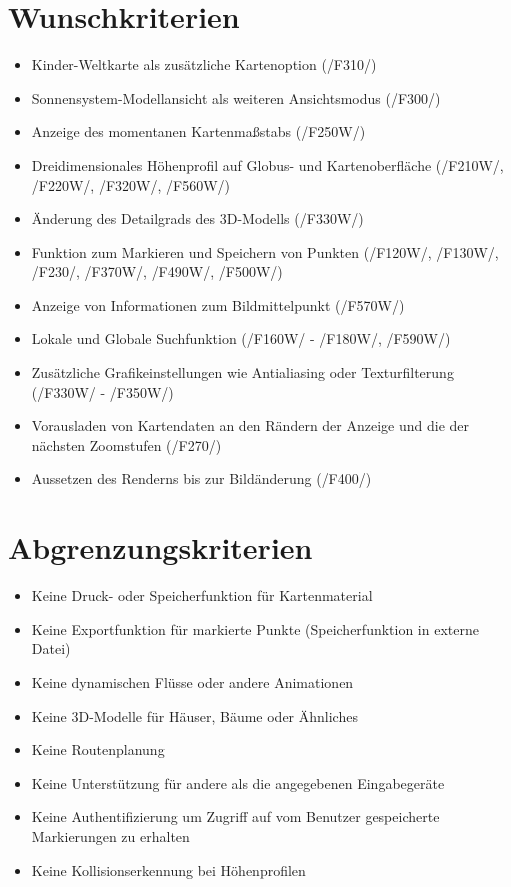 \documentclass[10pt]{scrreprt}
\newcommand{\ziel}[1]{{\fontsize{9.5}{11}\textsf{/#1/}}}
\begin{document}
\section{Wunschkriterien}
\begin{itemize}
\item Kinder-Weltkarte als zusätzliche Kartenoption (\ziel{F310})
\item Sonnensystem-Modellansicht als weiteren Ansichtsmodus (\ziel{F300})
\item Anzeige des momentanen Kartenmaßstabs (\ziel{F250W})
\item Dreidimensionales Höhenprofil auf Globus- und Kartenoberfläche (\ziel{F210W}, \ziel{F220W}, \ziel{F320W}, \ziel{F560W})
\item Änderung des Detailgrads des 3D-Modells (\ziel{F330W})
\item Funktion zum Markieren und Speichern von Punkten (\ziel{F120W}, \ziel{F130W}, \ziel{F230}, \ziel{F370W}, \ziel{F490W}, \ziel{F500W})
\item Anzeige von Informationen zum Bildmittelpunkt (\ziel{F570W})
\item Lokale und Globale Suchfunktion (\ziel{F160W} - \ziel{F180W}, \ziel{F590W})
\item Zusätzliche Grafikeinstellungen wie Antialiasing oder Texturfilterung (\ziel{F330W} - \ziel{F350W})
\item Vorausladen von Kartendaten an den Rändern der Anzeige und die der nächsten Zoomstufen (\ziel{F270})
\item Aussetzen des Renderns bis zur Bildänderung (\ziel{F400})
\end{itemize}

\section{Abgrenzungskriterien}
\begin{itemize}
\item Keine Druck- oder Speicherfunktion für Kartenmaterial
\item Keine Exportfunktion für markierte Punkte (Speicherfunktion in externe Datei)
\item Keine dynamischen Flüsse oder andere Animationen
\item Keine 3D-Modelle für Häuser, Bäume oder Ähnliches
\item Keine Routenplanung
\item Keine Unterstützung für andere als die angegebenen Eingabegeräte
\item Keine Authentifizierung um Zugriff auf vom Benutzer gespeicherte Markierungen zu erhalten
\item Keine Kollisionserkennung bei Höhenprofilen
\end{itemize}
\end{document}
